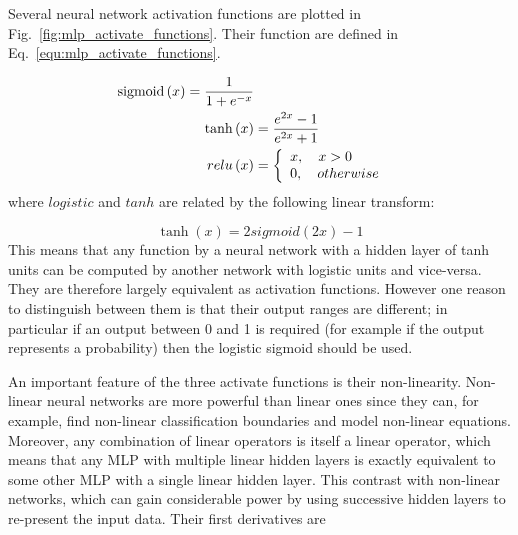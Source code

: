 \documentclass[runningheads,openany]{xhlPaper}
\begin{document}
Several neural network activation functions are plotted in Fig.~\ref{fig:mlp_activate_functions}. Their function are defined in Eq.~\ref{equ:mlp_activate_functions}.

\begin{equation}
\label{equ:mlp_activate_functions}
\begin{aligned}
{\rm{sigmoid}}\left( x \right) = \frac{1}{{1 + {e^{ - x}}}}\\
\tanh \left( x \right) &= \frac{{{e^{2x}} - 1}}{{{e^{2x}} + 1}}\\
relu\left( x \right) &= \left\{ {\begin{array}{*{20}{l}}
{x,\quad x > 0}\\
{0,\quad otherwise}
\end{array}} \right.
\end{aligned}
\end{equation}
where $logistic$ and $tanh$ are related by the following linear transform:

\begin{equation}
\label{equ:mlp_sigmoid_tanh_related}
\tanh \left( x \right) = 2sigmoid\left( {2x} \right) - 1
\end{equation}
This means that any function by a neural network with a hidden layer of tanh units can be computed by another network with logistic units and vice-versa.
They are therefore largely equivalent as activation functions.
However one reason to distinguish between them is that their output ranges are different; in particular if an output between 0 and 1 is required (for example if the output represents a probability) then the logistic sigmoid should be used.

An important feature of the three activate functions is their non-linearity. Non-linear neural networks are more powerful than linear ones since they can, for example, find non-linear classification boundaries and model non-linear equations. Moreover, any combination of linear operators is itself a linear operator, which means that any MLP with multiple linear hidden layers is exactly equivalent to some other MLP with a single linear hidden layer.
This contrast with non-linear networks, which can gain considerable power by using successive hidden layers to re-present the input data.
Their first derivatives are 
\end{document}

